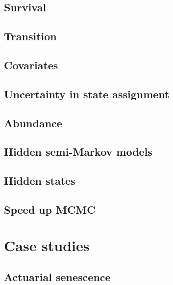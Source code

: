 \documentclass[
  12pt,
]{krantz}
\begin{document}
\citet{heller_novel_2021}

\hypertarget{survival}{%
\chapter{Survival}\label{survival}}

\hypertarget{transition}{%
\chapter{Transition}\label{transition}}

\hypertarget{covariates}{%
\chapter{Covariates}\label{covariates}}

\hypertarget{uncertainty}{%
\chapter{Uncertainty in state assignment}\label{uncertainty}}

\hypertarget{abundance}{%
\chapter{Abundance}\label{abundance}}

\hypertarget{hsmm}{%
\chapter{Hidden semi-Markov models}\label{hsmm}}

\hypertarget{states}{%
\chapter{Hidden states}\label{states}}

\hypertarget{speed}{%
\chapter{Speed up MCMC}\label{speed}}

\hypertarget{part-case-studies}{%
\part{Case studies}\label{part-case-studies}}

\hypertarget{senescence}{%
\chapter{Actuarial senescence}\label{senescence}}
\end{document}
